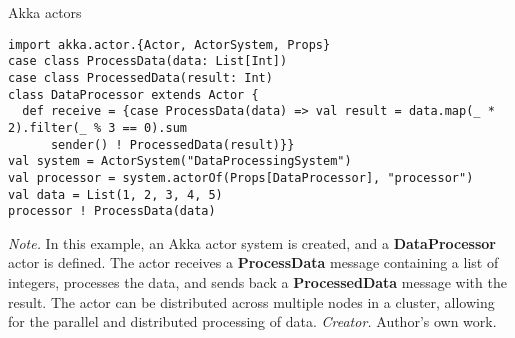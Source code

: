 \begin{table}[h!]
\caption{Akka actors}
\begin{lstlisting}
import akka.actor.{Actor, ActorSystem, Props}
case class ProcessData(data: List[Int])
case class ProcessedData(result: Int)
class DataProcessor extends Actor {
  def receive = {case ProcessData(data) => val result = data.map(_ * 2).filter(_ % 3 == 0).sum
      sender() ! ProcessedData(result)}}
val system = ActorSystem("DataProcessingSystem")
val processor = system.actorOf(Props[DataProcessor], "processor")
val data = List(1, 2, 3, 4, 5)
processor ! ProcessData(data)
\end{lstlisting}
\small
\textit{Note.} In this example, an Akka actor system is created, and a \textbf{DataProcessor} actor is defined. The actor receives a \textbf{ProcessData} message containing a list of integers, processes the data, and sends back a \textbf{ProcessedData} message with the result. The actor can be distributed across multiple nodes in a cluster, allowing for the parallel and distributed processing of data.
\textit{Creator.} Author's own work.
\end{table}